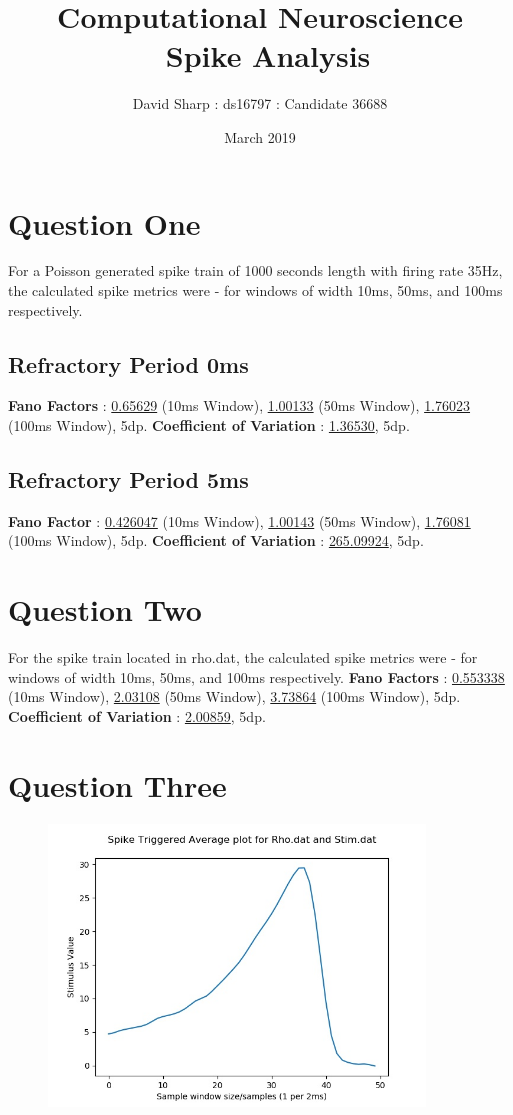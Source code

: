 \documentclass[10pt]{article}
\title{Computational Neuroscience \\\ Spike Analysis}
\author{David Sharp : ds16797 : Candidate 36688}
\date{March 2019}
\begin{document}
    \maketitle
    \section{Question One}
    For a Poisson generated spike train of 1000 seconds length with firing rate 35Hz,
    the calculated spike metrics were - for windows of width 10ms, 50ms, and 100ms respectively.
    \subsection{Refractory Period 0ms}
    \textbf{Fano Factors} : \underline{0.65629} (10ms Window), \underline{1.00133} (50ms Window), \underline{1.76023} (100ms Window), 5dp.
    \newline
    \textbf{Coefficient of Variation} :  \underline{1.36530}, 5dp.

    \subsection{Refractory Period 5ms}
    \textbf{Fano Factor} : \underline{0.426047} (10ms Window), \underline{1.00143} (50ms Window), \underline{1.76081} (100ms Window), 5dp.
    \newline
    \textbf{Coefficient of Variation} : \underline{265.09924}, 5dp.

    \section{Question Two}
    For the spike train located in rho.dat,
    the calculated spike metrics were - for windows of width 10ms, 50ms, and 100ms respectively.
    \newline
    \textbf{Fano Factors} : \underline{0.553338} (10ms Window), \underline{2.03108} (50ms Window), \underline{3.73864} (100ms Window), 5dp.
    \newline
    \textbf{Coefficient of Variation} :  \underline{2.00859}, 5dp.

    \section{Question Three}
    \begin{figure}
        \includegraphics[width=10cm ]{sta.jpg}
        \label{fig:staGraph}
    \end{figure}
\end{document}
